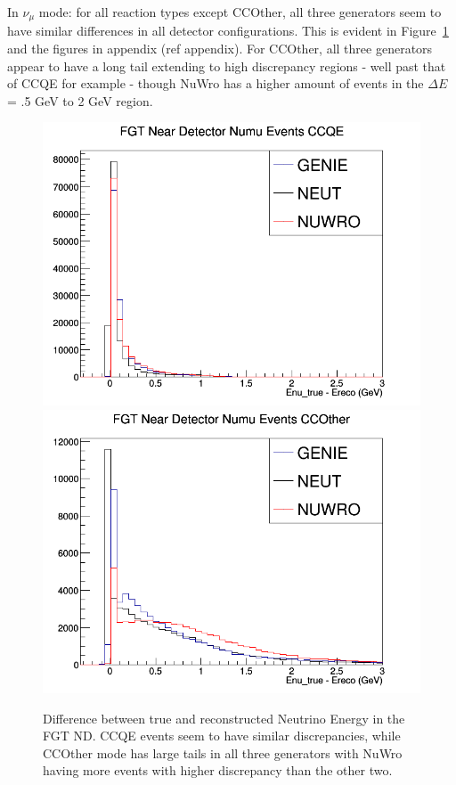 \documentclass[12pt]{article}
\begin{document}
In $\nu_\mu$ mode: for all reaction types except CCOther, all three generators seem to have similar differences in all detector configurations. This is evident in Figure~\ref{fig:numu_Etrue_ereco_FGT_CCQE_and_CCOther} and the figures in appendix (ref appendix). For CCOther, all three generators appear to have a long tail extending to high discrepancy regions - well past that of CCQE for example - though NuWro has a higher amount of events in the $\Delta E$ = .5 GeV to 2 GeV region. 
\begin{figure}[h]
\centering
{}
\includegraphics[width=\linewidth]{Ereco_Etrue/numu_FGT_CCQE.png}
\endminipage
{}
\includegraphics[width=\linewidth]{Ereco_Etrue/numu_FGT_CCOther.png}
\endminipage
\caption{Difference between true and reconstructed Neutrino Energy in the FGT ND. CCQE events seem to have similar discrepancies, while CCOther mode has large tails in all three generators with NuWro having more events with higher discrepancy than the other two. }
\label{fig:numu_Etrue_ereco_FGT_CCQE_and_CCOther}
\end{figure}
\FloatBarrier
\end{document}
